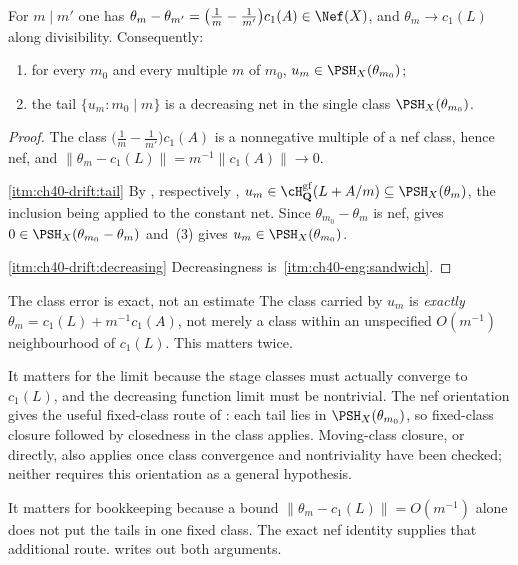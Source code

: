 \begin{lemma}
\label{lem:ch40-drift-nef-monotone}
For $m\mid m'$ one has $\theta_m-\theta_{m'}
=\bigl(\tfrac1m-\tfrac1{m'}\bigr)c_1(A)\in\Nef(X)$, and
$\theta_m\to c_1(L)$ along divisibility.  Consequently:
\begin{enumerate}
\item\label{itm:ch40-drift:tail}
 for every $m_0$ and every multiple $m$ of $m_0$,
 $u_m\in\PSH_X(\theta_{m_0})$;
\item\label{itm:ch40-drift:decreasing}
 the tail $\{u_m:m_0\mid m\}$ is a decreasing net in the single class
 $\PSH_X(\theta_{m_0})$.
\end{enumerate}
\end{lemma}

\begin{proof}
The class $\bigl(\tfrac1m-\tfrac1{m'}\bigr)c_1(A)$ is a nonnegative
multiple of a nef class, hence nef, and
$\lVert\theta_m-c_1(L)\rVert=m^{-1}\lVert c_1(A)\rVert\to0$.

\cref{itm:ch40-drift:tail}  By
, respectively
,
$u_m\in\cH^{\mathrm{gf}}_{\mathbf Q}(L+A/m)\subseteq\PSH_X(\theta_m)$, the
inclusion being  applied to the constant net.  Since
$\theta_{m_0}-\theta_m$ is nef,  gives
$0\in\PSH_X(\theta_{m_0}-\theta_m)$ and
\,(3) gives $u_m\in\PSH_X(\theta_{m_0})$.

\cref{itm:ch40-drift:decreasing}  Decreasingness is
\,\cref{itm:ch40-eng:sandwich}.
\end{proof}

\begin{warning}{The class error is exact, not an estimate}
\label{warn:ch40-exact-class}
The class carried by $u_m$ is \emph{exactly} $\theta_m=c_1(L)+m^{-1}c_1(A)$,
not merely a class within an unspecified $O(m^{-1})$ neighbourhood of
$c_1(L)$.  This matters twice.

It matters for the limit because the stage classes must actually
converge to $c_1(L)$, and the decreasing function limit must be nontrivial.
The nef orientation gives the useful fixed-class route of
: each tail lies in
$\PSH_X(\theta_{m_0})$, so fixed-class closure followed by closedness in
the class applies.  Moving-class closure, or  directly,
also applies once class convergence and nontriviality have been checked;
neither requires this orientation as a general hypothesis.

It matters for bookkeeping because a bound
$\lVert\theta_m-c_1(L)\rVert=O(m^{-1})$ alone does not put the tails
in one fixed class.  The exact nef identity supplies that additional
route.   writes out both arguments.
\end{warning}

